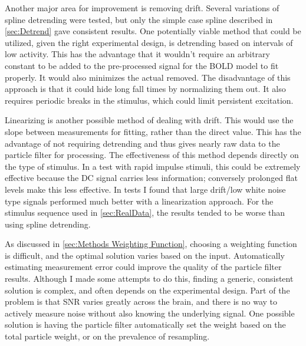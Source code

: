 Another major area for improvement is removing drift.
Several variations of spline detrending were tested, but only
the simple case spline described in \autoref{sec:Detrend}
gave consistent results.
One potentially viable method that could be utilized, given the right
experimental design, is detrending based on intervals of low activity. This
has the advantage that it wouldn't require an arbitrary
constant to be added to the pre-processed signal for the
\ac{BOLD} model to fit properly. It would also minimizes the actual
removed. The disadvantage of this approach is
that it could hide long fall times by normalizing them
out. It also requires periodic breaks in the stimulus,
which could limit persistent excitation.

Linearizing is another possible method of dealing with drift.
This would use the slope between measurements for fitting, rather than the
direct value. This has the advantage of not requiring detrending and thus
gives nearly raw data to the particle filter for processing.
The effectiveness of this method depends directly on the type of stimulus.
In a test with rapid impulse stimuli, this could be extremely effective because
the \ac{DC} signal carries less information; conversely prolonged flat levels make this less effective.
In tests I found that large drift/low white noise
type signals performed much better with a linearization approach.
For the stimulus sequence used in \autoref{sec:RealData}, the results tended to be worse
than using spline detrending.

As discussed in \autoref{sec:Methods Weighting Function}, choosing a weighting
function is difficult, and the optimal solution varies based on the input.
Automatically estimating measurement error could improve
the quality of the particle filter results. Although I made some attempts to do
this, finding a generic, consistent solution is complex, and often depends on the
experimental design. Part of the problem is that \ac{SNR} varies greatly across
the brain, and there is no way to actively measure noise without also knowing
the underlying signal. One possible solution is having the particle filter automatically
set the weight based on the total particle weight, or on the prevalence of resampling.

